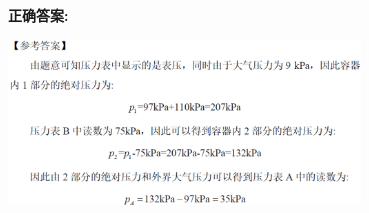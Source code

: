 \documentclass[12pt]{article}
\begin{document}
\textbf{正确答案:}

\begin{center}\includegraphics[width=0.7\textwidth, height=0.2\textheight, keepaspectratio]{question_31_17681927/correct_answer_1_img_1.png}\end{center}

\vspace{0.5em}\hrulefill\vspace{1em}
\end{document}
